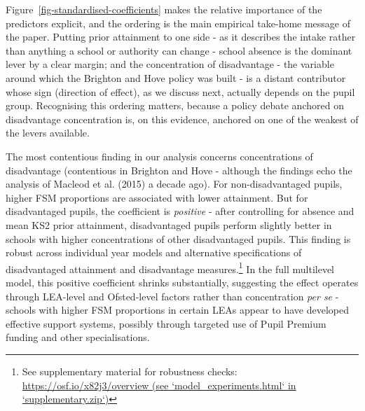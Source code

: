 \documentclass[
  12pt,
  titlepage]{article}
\begin{document}
Figure~\ref{fig-standardised-coefficients} makes the relative importance
of the predictors explicit, and the ordering is the main empirical
take-home message of the paper. Putting prior attainment to one side -
as it describes the intake rather than anything a school or authority
can change - school absence is the dominant lever by a clear margin; and
the concentration of disadvantage - the variable around which the
Brighton and Hove policy was built - is a distant contributor whose sign
(direction of effect), as we discuss next, actually depends on the pupil
group. Recognising this ordering matters, because a policy debate
anchored on disadvantage concentration is, on this evidence, anchored on
one of the weakest of the levers available.

The most contentious finding in our analysis concerns concentrations of
disadvantage (contentious in Brighton and Hove - although the findings
echo the analysis of Macleod et al. (2015) a decade ago). For
non-disadvantaged pupils, higher FSM proportions are associated with
lower attainment. But for disadvantaged pupils, the coefficient is
\emph{positive} - after controlling for absence and mean KS2 prior
attainment, disadvantaged pupils perform slightly better in schools with
higher concentrations of other disadvantaged pupils. This finding is
robust across individual year models and alternative specifications of
disadvantaged attainment and disadvantage measures.\footnote{See
  supplementary material for robustness checks:
  \href{https://osf.io/x82j3/overview}{https://osf.io/x82j3/overview
  (see `model\_experiments.html` in `supplementary.zip`)}} In the full
multilevel model, this positive coefficient shrinks substantially,
suggesting the effect operates through LEA-level and Ofsted-level
factors rather than concentration \emph{per se} - schools with higher
FSM proportions in certain LEAs appear to have developed effective
support systems, possibly through targeted use of Pupil Premium funding
and other specialisations.
\end{document}
